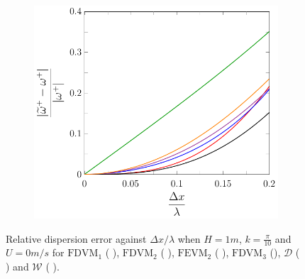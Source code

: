 \begin{figure}
\begin{subfigure}{0.5\textwidth}
	\end{subfigure}
	\par\bigskip
	\begin{subfigure}{0.5\textwidth}
		\includegraphics[width=\textwidth]{./chp4/figures/New/Dispu0Shall.pdf}
	\end{subfigure}
	\caption{Relative dispersion error against $\Delta x / \lambda$ when $H = 1m$, $k = \frac{\pi}{10}$ and $U = 0 m/s$ for $\text{FDVM}_1$ ({\color{green!60!black} \solidrule}), $\text{FDVM}_2$ ({\color{red} \solidrule}), $\text{FEVM}_2$ ({\color{blue} \solidrule}), $\text{FDVM}_3$ ({\solidrule}), $\mathcal{D}$ ({\color{violet!80!white} \solidrule}) and $\mathcal{W}$ ({\color{orange} \solidrule}).}
	\label{fig:Dispu0Shall}
\end{figure}
